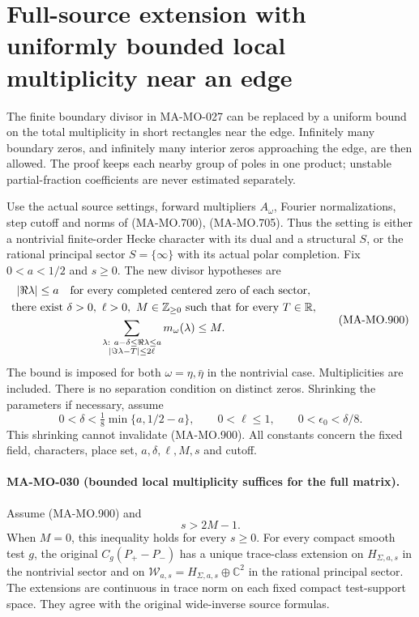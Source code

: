 \section{Full-source extension with uniformly bounded local multiplicity near an edge}
\label{sec:bounded-boundary-clusters}

The finite boundary divisor in MA-MO-027 can be replaced
by a uniform bound on the total multiplicity in short
rectangles near the edge. Infinitely many boundary zeros,
and infinitely many interior zeros approaching the edge,
are then allowed. The proof keeps each nearby group of
poles in one product; unstable partial-fraction
coefficients are never estimated separately.

Use the actual source settings, forward multipliers
\(A_\omega\), Fourier normalizations, step cutoff and
norms of (MA-MO.700), (MA-MO.705). Thus the setting is
either a nontrivial finite-order Hecke character with
its dual and a structural \(S\), or the rational
principal sector \(S=\{\infty\}\) with its actual
polar completion. Fix \(0<a<1/2\) and \(s\ge0\).
The new divisor hypotheses are
\[
 \begin{gathered}
 |\Re\lambda|\le a
       \quad\hbox{for every completed centered zero of each sector},\\
 \text{there exist }\delta>0,\ \ell>0,\ M\in\mathbb Z_{\ge0}
       \text{ such that for every }T\in\mathbb R,\\
 \sum_{\substack{\lambda:\ a-\delta\le\Re\lambda\le a\\
                         |\Im\lambda-T|\le2\ell}}
                         m_\omega(\lambda)\le M .
 \end{gathered}
 \tag{MA-MO.900}
\]
The bound is imposed for both \(\omega=\eta,\bar\eta\)
in the nontrivial case. Multiplicities are included.
There is no separation condition on distinct zeros.
Shrinking the parameters if necessary, assume
\[
 0<\delta<\tfrac18\min\{a,1/2-a\},
                  \qquad 0<\ell\le1,\qquad
                  0<\epsilon_0<\delta/8 .
 \tag{MA-MO.901}
\]
This shrinking cannot invalidate (MA-MO.900).
All constants concern the fixed field, characters,
place set, \(a,\delta,\ell,M,s\) and cutoff.

\paragraph{MA-MO-030 (bounded local multiplicity suffices for the full matrix).}
Assume (MA-MO.900) and
\[
                         s>2M-1 .
 \tag{MA-MO.902}
\]
When \(M=0\), this inequality holds for every \(s\ge0\).
For every compact smooth test \(g\), the original
\(C_g(P_+-P_-)\) has a unique trace-class extension
on \(H_{\Sigma,a,s}\) in the nontrivial sector and
on \(\mathcal W_{a,s}=H_{\Sigma,a,s}\oplus\mathbb C^2\)
in the rational principal sector. The extensions
are continuous in trace norm on each fixed compact
test-support space. They agree with the original
wide-inverse source formulas.

